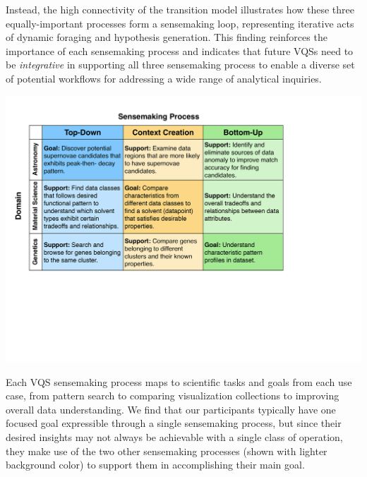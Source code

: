  Instead, the high connectivity of the transition model illustrates how these three equally-important processes form a sensemaking loop, representing iterative acts of dynamic foraging and hypothesis generation. This finding reinforces the importance of each sensemaking process and indicates that future VQSs need to be \emph{integrative} in supporting all three sensemaking process to enable a diverse set of potential workflows for addressing a wide range of analytical inquiries. %
 \begin{table}[h!]
   \centering
   \includegraphics[width=\linewidth]{figures/science_task.pdf}
   \vspace{-6pt}\caption{Each VQS sensemaking process maps to scientific tasks and goals from each use case, from pattern search to comparing visualization collections to improving overall data understanding. We find that our participants typically have one focused goal expressible through a single sensemaking process, but since their desired insights may not always be achievable with a single class of operation, they make use of the two other sensemaking processes (shown with lighter background color) to support them in accomplishing their main goal.}
   \label{science_task}
   \vspace{-10pt}
\end{table}
